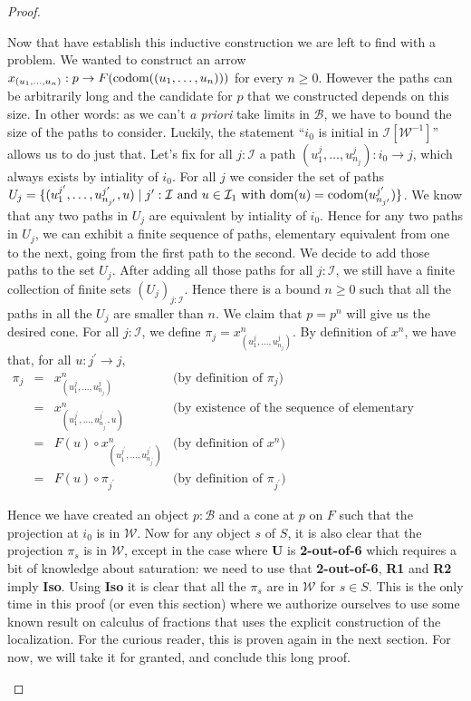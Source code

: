 \documentclass{article}
\numberwithin{equation}{section}
\theoremstyle{definition}
\theoremstyle{plain}
\begin{document}
\begin{proof}
\begin{enumerate}
Now that have establish this inductive construction we are left to find with a problem. We wanted to construct an arrow $x_{(u_1, \dots, u_n)}: p \to F(\textnormal{codom}((u_1, \dots, u_n)))$ for every $n \ge 0$. However the paths can be arbitrarily long and the candidate for $p$ that we constructed depends on this size. In other words: as we can't \textit{a priori} take limits in $\mathcal{B}$, we have to bound the size of the paths to consider. Luckily, the statement ``$i_0$ is initial in $\mathcal{I}[\mathcal{W}^{-1}]$'' allows us to do just that. Let's fix for all $j:\mathcal{I}$ a path $(u^j_1, \dots, u^j_{n_j}): i_0 \to j$, which always exists by intiality of $i_0$. For all $j$ we consider the set of paths $U_j = \{(u^{j^{\prime}}_1, \dots, u^{j^{\prime}}_{n_{j^{\prime}}},u) \mid j^{\prime}: \mathcal{I} \textnormal{ and } u \in \mathcal{I}_1 \textnormal{ with dom}(u) = \textnormal{codom}(u^{j^{\prime}}_{n_{j^{\prime}}})\}$. We know that any two paths in $U_j$ are equivalent by intiality of $i_0$. Hence for any two paths in $U_j$, we can exhibit a finite sequence of paths, elementary equivalent from one to the next, going from the first path to the second. We decide to add those paths to the set $U_j$. After adding all those paths for all $j:\mathcal{I}$, we still have a finite collection of finite sets $(U_j)_{j:\mathcal{I}}$. Hence there is a bound $n\ge 0$ such that all the paths in all the $U_j$ are smaller than $n$. We claim that $p = p^n$ will give us the desired cone. For all $j:\mathcal{I}$, we define $\pi_j = x^n_{(u^j_1, \dots, u^j_{n_j})}$. By definition of $x^n$, we have that, for all $u: j^{\prime} \to j$,
\[\begin{array}{rclr}
	\pi_j & = & x^n_{(u^j_1, \dots, u^j_{n_j})} & \text{(by definition of $\pi_j$)}\\
	& = &  x^n_{(u^{j^{\prime}}_1, \dots, u^{j^{\prime}}_{n_{j^{\prime}}},u)} & \text{(by existence of the sequence of elementary equivalences)}\\
	& = & F(u) \circ x^n_{(u^{j^{\prime}}_1, \dots, u^{j^{\prime}}_{n_{j^{\prime}}})} & \text{(by definition of $x^n$)}\\
	& = & F(u) \circ \pi_{j^{\prime}} & \text{(by definition of $\pi_{j^{\prime}}$)}
\end{array}\]

Hence we have created an object $p:\mathcal{B}$ and a cone at $p$ on $F$ such that the projection at $i_0$ is in $\mathcal{W}$. Now for any object $s$ of $S$, it is also clear that the projection $\pi_s$ is in $\mathcal{W}$, except in the case where \textbf{U} is \textbf{2-out-of-6} which requires a bit of knowledge about saturation: we need to use that \textbf{2-out-of-6}, \textbf{R1} and \textbf{R2} imply \textbf{Iso}. Using \textbf{Iso} it is clear that all the $\pi_s$ are in $\mathcal{W}$ for $s \in S$. This is the only time in this proof (or even this section) where we authorize ourselves to use some known result on calculus of fractions that uses the explicit construction of the localization. For the curious reader, this is proven again in the next section. For now, we will take it for granted, and conclude this long proof.
\end{enumerate}
\end{proof}
\end{document}
